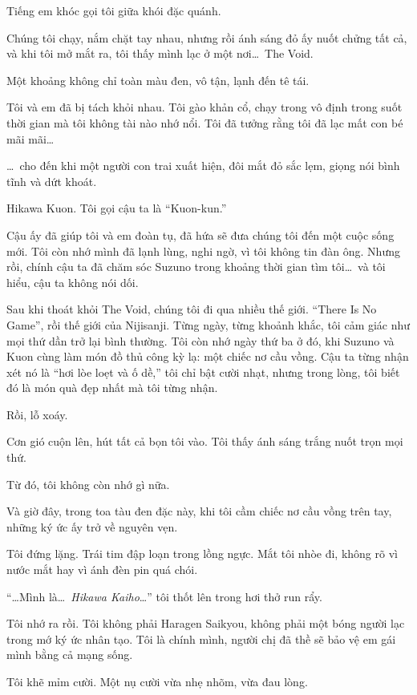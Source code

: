 \documentclass[../main.tex]{subfiles}
\begin{document}
Tiếng em khóc gọi tôi giữa khói đặc quánh.

Chúng tôi chạy, nắm chặt tay nhau, nhưng rồi ánh sáng đỏ ấy nuốt chửng tất cả, và khi tôi mở mắt ra, tôi thấy mình lạc ở một nơi\dots\ The Void.

Một khoảng không chỉ toàn màu đen, vô tận, lạnh đến tê tái.

Tôi và em đã bị tách khỏi nhau. Tôi gào khản cổ, chạy trong vô định trong suốt thời gian mà tôi không tài nào nhớ nổi. Tôi đã tưởng rằng tôi đã lạc mất con bé mãi mãi\dots

\dots\ cho đến khi một người con trai xuất hiện, đôi mắt đỏ sắc lẹm, giọng nói bình tĩnh và dứt khoát.

Hikawa Kuon. Tôi gọi cậu ta là ``Kuon-kun.''

Cậu ấy đã giúp tôi và em đoàn tụ, đã hứa sẽ đưa chúng tôi đến một cuộc sống mới. Tôi còn nhớ mình đã lạnh lùng, nghi ngờ, vì tôi không tin đàn ông. Nhưng rồi, chính cậu ta đã chăm sóc Suzuno trong khoảng thời gian tìm tôi\dots\ và tôi hiểu, cậu ta không nói dối.

Sau khi thoát khỏi The Void, chúng tôi đi qua nhiều thế giới. ``There Is No Game'', rồi thế giới của Nijisanji. Từng ngày, từng khoảnh khắc, tôi cảm giác như mọi thứ dần trở lại bình thường. Tôi còn nhớ ngày thứ ba ở đó, khi Suzuno và Kuon cùng làm món đồ thủ công kỳ lạ: một chiếc nơ cầu vồng. Cậu ta từng nhận xét nó là ``hơi lòe loẹt và ố dề,'' tôi chỉ bật cười nhạt, nhưng trong lòng, tôi biết đó là món quà đẹp nhất mà tôi từng nhận.

Rồi, lỗ xoáy.

Cơn gió cuộn lên, hút tất cả bọn tôi vào. Tôi thấy ánh sáng trắng nuốt trọn mọi thứ.

Từ đó, tôi không còn nhớ gì nữa.

Và giờ đây, trong toa tàu đen đặc này, khi tôi cầm chiếc nơ cầu vồng trên tay, những ký ức ấy trở về nguyên vẹn.

Tôi đứng lặng. Trái tim đập loạn trong lồng ngực. Mắt tôi nhòe đi, không rõ vì nước mắt hay vì ánh đèn pin quá chói.

``\dots Mình là\dots\ \emph{Hikawa Kaiho}\dots'' tôi thốt lên trong hơi thở run rẩy.

Tôi nhớ ra rồi. Tôi không phải Haragen Saikyou, không phải một bóng người lạc trong mớ ký ức nhân tạo. Tôi là chính mình, người chị đã thề sẽ bảo vệ em gái mình bằng cả mạng sống.

Tôi khẽ mỉm cười. Một nụ cười vừa nhẹ nhõm, vừa đau lòng.
\end{document}
